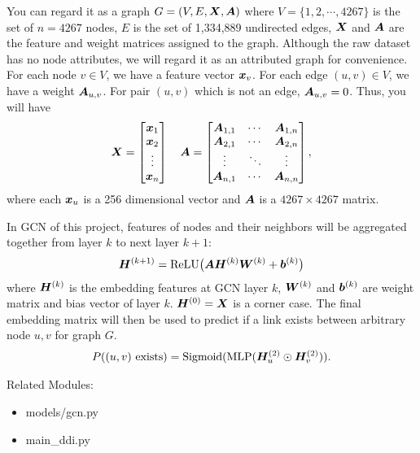 %
You can regard it as a graph $G = (V, E, \bm{X}, \bm{A})$ where $V = \{1, 2, \cdots,
4267\}$ is the set of $n = 4267$ nodes, $E$ is the set of 1,334,889 undirected
edges, $\bm{X}$ and $\bm{A}$ are the feature and weight matrices assigned to the
graph.
%
Although the raw dataset has no node attributes, we will regard it as an
attributed graph for convenience.
%
For each node $v \in V$, we have a feature vector $\bm{x}_{v}$.
For each edge $(u, v) \in V$, we have a weight $\bm{A}_{u, v}$.
For pair $(u, v)$ which is not an edge, $\bm{A}_{u, v} = 0$.
%
Thus, you will have
%
\begin{align}
%
    \mX = \begin{bmatrix}
        \vx_{1} \\
        \vx_{2} \\
        \vdots \\
        \vx_{n}
    \end{bmatrix} \quad \mA = \begin{bmatrix}
        \mA_{1, 1} & \cdots & \mA_{1, n} \\
        \mA_{2, 1} & \cdots & \mA_{2, n} \\
        \vdots & \ddots & \vdots \\
        \mA_{n, 1} & \cdots & \mA_{n, n}
    \end{bmatrix},
%
\end{align}
%
where each $\bm{x}_{u}$ is a 256 dimensional vector and $\bm{A}$ is a $4267 \times
4267$ matrix.

%
\hfill

%
In GCN of this project, features of nodes and their neighbors will be
aggregated together from layer $k$ to next layer $k + 1$:
%
\begin{align}
\label{eqn:gcn}
%
    \mH^{(k + 1)} = \text{ReLU}\big( \mA \mH^{(k)} \mW^{(k)} + \vb^{(k)}\big)
%
\end{align}
%
where $\bm{H}^{(k)}$ is the embedding features at GCN layer $k$, $\bm{W}^{(k)}$ and
$\bm{b}^{(k)}$ are weight matrix and bias vector of layer $k$.
$\bm{H}^{(0)} = \bm{X}$ is a corner case.
%
The final embedding matrix will then be used to predict if a link exists
between arbitrary node $u, v$ for graph $G$.
%
\begin{align*}
%
    P(\text{$(u, v)$ exists}) = \text{Sigmoid}(\text{MLP}(\mH^{(2)}_{u} \odot
    \mH^{(2)}_{v})).
%
\end{align*}

%
\hfill

%
\noindent Related Modules:
%
\begin{itemize}
%
\item
    models/gcn.py
\item
    main\_ddi.py
%
\end{itemize}

